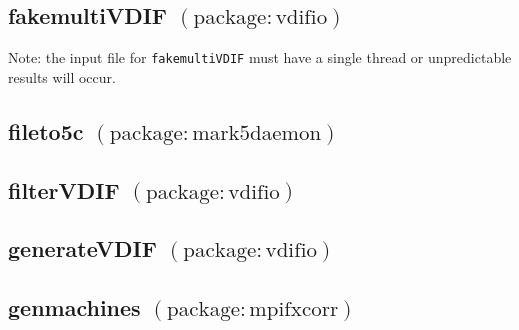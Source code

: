
\subsection{fakemultiVDIF {\small $\mathrm{(package: vdifio)}$}} \label{sec:fakemultivdif}

Note: the input file for {\tt fakemultiVDIF} must have a single thread or unpredictable results will occur.





\subsection{fileto5c {\small $\mathrm{(package: mark5daemon)}$}} \label{sec:fileto5c}






\subsection{filterVDIF {\small $\mathrm{(package: vdifio)}$}} \label{sec:filtervdif}




\subsection{generateVDIF {\small $\mathrm{(package: vdifio)}$}} \label{sec:generatevdif}





\subsection{genmachines {\small $\mathrm{(package: mpifxcorr)}$}} \label{sec:genmachines}

